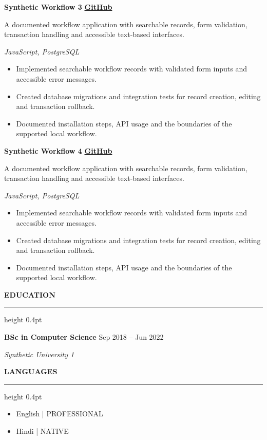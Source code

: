 \documentclass[10pt,letterpaper]{article}
\newcommand{\atsSectionToSection}{6.1pt}
\newcommand{\atsHeadingToContent}{2pt}
\newcommand{\atsEntryToEntry}{3.4pt}
\newcommand{\atsProjectTitleToTech}{1pt}
\newcommand{\atsProjectTechToBullets}{1.5pt}
\newcommand{\atsRoleToMetadata}{1pt}
\newcommand{\atsBulletToBullet}{0.6pt}
\newcommand{\atssection}[1]{%
  \vspace{\atsSectionToSection}%
  {\noindent\large\bfseries\uppercase{#1}}\par
  \vspace{1.5pt}\hrule height 0.4pt\vspace{\atsHeadingToContent}%
}
\begin{document}
\vspace{\atsEntryToEntry}
\textbf{Synthetic Workflow 3} \hfill {\small \href{https://github.com/synthetic-fixture/project-5}{\textbf{GitHub}}}\par
A documented workflow application with searchable records, form validation, transaction handling and accessible text-based interfaces.\par
\vspace{\atsProjectTitleToTech}
{\textit{JavaScript, PostgreSQL}}\par
\vspace{\atsProjectTechToBullets}
\begin{itemize}
\setlength{\itemsep}{\atsBulletToBullet}\setlength{\parskip}{0pt}\setlength{\parsep}{0pt}\setlength{\topsep}{0pt}\setlength{\partopsep}{0pt}
  \item Implemented searchable workflow records with validated form inputs and accessible error messages.
  \item Created database migrations and integration tests for record creation, editing and transaction rollback.
  \item Documented installation steps, API usage and the boundaries of the supported local workflow.
\end{itemize}
\vspace{\atsEntryToEntry}
\textbf{Synthetic Workflow 4} \hfill {\small \href{https://github.com/synthetic-fixture/project-6}{\textbf{GitHub}}}\par
A documented workflow application with searchable records, form validation, transaction handling and accessible text-based interfaces.\par
\vspace{\atsProjectTitleToTech}
{\textit{JavaScript, PostgreSQL}}\par
\vspace{\atsProjectTechToBullets}
\begin{itemize}
\setlength{\itemsep}{\atsBulletToBullet}\setlength{\parskip}{0pt}\setlength{\parsep}{0pt}\setlength{\topsep}{0pt}\setlength{\partopsep}{0pt}
  \item Implemented searchable workflow records with validated form inputs and accessible error messages.
  \item Created database migrations and integration tests for record creation, editing and transaction rollback.
  \item Documented installation steps, API usage and the boundaries of the supported local workflow.
\end{itemize}

\atssection{Education}
\textbf{BSc in Computer Science} \hfill Sep 2018 -- Jun 2022\par
\vspace{\atsRoleToMetadata}
{\small\textit{Synthetic University 1}}\par

\atssection{Languages}
\begin{itemize}
\item English | PROFESSIONAL
\item Hindi | NATIVE
\end{itemize}
\end{document}
